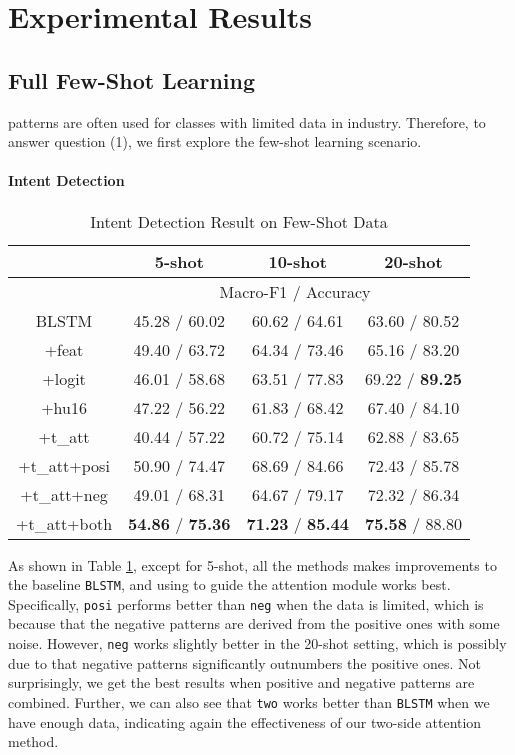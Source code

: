 \section{Experimental Results}
\label{sec:experiments}

\subsection{Full Few-Shot Learning}
\RE patterns are often used for classes with limited data in industry. Therefore, to answer question (1), we first explore the few-shot learning scenario.

\paragraph{Intent Detection}

\begin{table}
\setlength{\tabcolsep}{0.23em}
\centering
\small{
\begin{tabular}{|c|c|c|c|}

\hline
  & \multicolumn{1}{|c|}{5-shot} & \multicolumn{1}{|c|}{10-shot} & \multicolumn{1}{|c|}{20-shot}  \\
 \hline
  & \multicolumn{3}{|c|}{Macro-F1 / Accuracy} \\
\hline
BLSTM & 45.28 / 60.02 & 60.62 / 64.61 & 63.60 / 80.52  \\
\hline
+feat & 49.40 / 63.72 & 64.34 / 73.46 & 65.16 / 83.20   \\
\hline
+logit & 46.01 / 58.68 & 63.51 / 77.83 & 69.22 / \textbf{89.25} \\
\hline
+hu16 & 47.22 / 56.22 & 61.83 / 68.42 & 67.40 / 84.10  \\
\hline
+t\_att & 40.44 / 57.22 & 60.72 / 75.14 & 62.88 / 83.65  \\
\hline
+t\_att+posi & 50.90 / 74.47 & 68.69 / 84.66 & 72.43 / 85.78  \\
\hline
+t\_att+neg & 49.01 / 68.31 & 64.67 / 79.17 & 72.32 / 86.34   \\
\hline
+t\_att+both & \textbf{54.86} / \textbf{75.36} & \textbf{71.23} / \textbf{85.44} & \textbf{75.58} / 88.80   \\
\hline

\end{tabular}
}
\caption{Intent Detection Result on Few-Shot Data}
\label{tab_intent_few}
\end{table}

As shown in Table \ref{tab_intent_few}, except for 5-shot, all the methods makes improvements to the baseline \texttt{BLSTM}, and using \RE to guide the attention module works best. Specifically, \texttt{posi} performs better than \texttt{neg} when the data is limited, which is because that the negative patterns are derived from the positive ones with some noise. However, \texttt{neg} works slightly better in the 20-shot setting, which is possibly due to that negative patterns significantly outnumbers the positive ones. Not surprisingly, we get the best results when positive and negative patterns are combined. Further, we can also see that \texttt{two} works better than \texttt{BLSTM} when we have enough data, indicating again the effectiveness of our two-side attention method.

